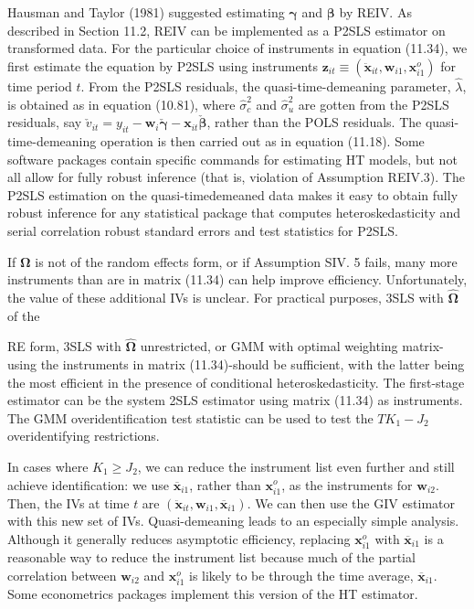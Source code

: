 \documentclass[10pt]{article}
\begin{document}
Hausman and Taylor (1981) suggested estimating $\boldsymbol{\gamma}$ and $\boldsymbol{\beta}$ by REIV. As described in Section 11.2, REIV can be implemented as a P2SLS estimator on transformed data. For the particular choice of instruments in equation (11.34), we first estimate the equation by P2SLS using instruments $\mathbf{z}_{i t} \equiv\left(\ddot{\mathbf{x}}_{i t}, \mathbf{w}_{i 1}, \mathbf{x}_{i 1}^{o}\right)$ for time period $t$. From the P2SLS residuals, the quasi-time-demeaning parameter, $\hat{\lambda}$, is obtained as in equation (10.81), where $\hat{\sigma}_{c}^{2}$ and $\hat{\sigma}_{u}^{2}$ are gotten from the P2SLS residuals, say $\check{v}_{i t}= y_{i t}-\mathbf{w}_{i} \check{\boldsymbol{\gamma}}-\mathbf{x}_{i t} \check{\boldsymbol{\beta}}$, rather than the POLS residuals. The quasi-time-demeaning operation is then carried out as in equation (11.18). Some software packages contain specific commands for estimating HT models, but not all allow for fully robust inference (that is, violation of Assumption REIV.3). The P2SLS estimation on the quasi-timedemeaned data makes it easy to obtain fully robust inference for any statistical package that computes heteroskedasticity and serial correlation robust standard errors and test statistics for P2SLS.

If $\boldsymbol{\Omega}$ is not of the random effects form, or if Assumption SIV. 5 fails, many more instruments than are in matrix (11.34) can help improve efficiency. Unfortunately, the value of these additional IVs is unclear. For practical purposes, 3SLS with $\hat{\boldsymbol{\Omega}}$ of the

RE form, 3SLS with $\hat{\boldsymbol{\Omega}}$ unrestricted, or GMM with optimal weighting matrix-using the instruments in matrix (11.34)-should be sufficient, with the latter being the most efficient in the presence of conditional heteroskedasticity. The first-stage estimator can be the system 2SLS estimator using matrix (11.34) as instruments. The GMM overidentification test statistic can be used to test the $T K_{1}-J_{2}$ overidentifying restrictions.

In cases where $K_{1} \geq J_{2}$, we can reduce the instrument list even further and still achieve identification: we use $\overline{\mathbf{x}}_{i 1}$, rather than $\mathbf{x}_{i 1}^{o}$, as the instruments for $\mathbf{w}_{i 2}$. Then, the IVs at time $t$ are $\left(\ddot{\mathbf{x}}_{i t}, \mathbf{w}_{i 1}, \overline{\mathbf{x}}_{i 1}\right)$. We can then use the GIV estimator with this new set of IVs. Quasi-demeaning leads to an especially simple analysis. Although it generally reduces asymptotic efficiency, replacing $\mathbf{x}_{i 1}^{o}$ with $\overline{\mathbf{x}}_{i 1}$ is a reasonable way to reduce the instrument list because much of the partial correlation between $\mathbf{w}_{i 2}$ and $\mathbf{x}_{i 1}^{o}$ is likely to be through the time average, $\overline{\mathbf{x}}_{i 1}$. Some econometrics packages implement this version of the HT estimator.
\end{document}
